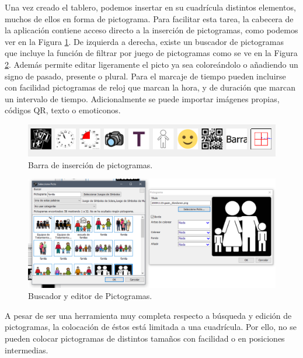 Una vez creado el tablero, podemos insertar en su cuadrícula distintos elementos, muchos de ellos en forma de pictograma. Para facilitar esta tarea, la cabecera de la aplicación contiene acceso directo a la inserción de pictogramas, como podemos ver en la Figura \ref{fig:ribbon-pictoselector}. De izquierda a derecha, existe un buscador de pictogramas que incluye la función de filtrar por juego de pictogramas como se ve en la Figura \ref{fig:editor-y-buscador-de-pictoselector}. Además permite editar ligeramente el picto ya sea coloreándolo o añadiendo un signo de pasado, presente o plural. Para el marcaje de tiempo pueden incluirse con facilidad pictogramas de reloj que marcan la hora, y de duración que marcan un intervalo de tiempo. Adicionalmente se puede importar imágenes propias, códigos QR, texto o emoticonos.
\begin{figure}[h!]
	\centering
	\includegraphics[width=0.9\linewidth]{Imagenes/Bitmap/Ribbon Pictoselector}
	\caption{Barra de inserción de pictogramas.}
	\label{fig:ribbon-pictoselector}
\end{figure}

\begin{figure}[h!]
	\centering
	\includegraphics[width=1\linewidth]{Imagenes/Bitmap/Editor y buscador de pictoselector}
	\caption{Buscador y editor de Pictogramas.}
	\label{fig:editor-y-buscador-de-pictoselector}
\end{figure}

A pesar de ser una herramienta muy completa respecto a búsqueda y edición de pictogramas, la colocación de éstos está limitada a una cuadrícula. Por ello, no se pueden colocar pictogramas de distintos tamaños con facilidad o en posiciones intermedias.

